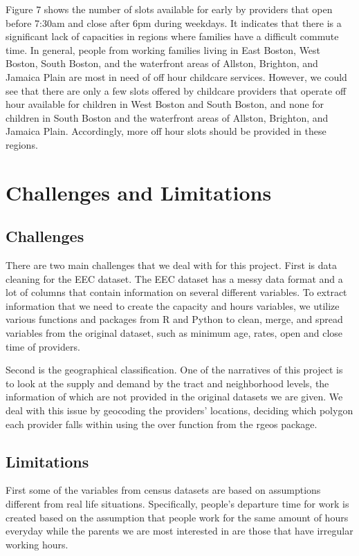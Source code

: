 \documentclass[10pt,letterpaper]{article}
\begin{document}
Figure 7 shows the number of slots available for early by providers that
open before 7:30am and close after 6pm during weekdays. It indicates
that there is a significant lack of capacities in regions where families
have a difficult commute time. In general, people from working families
living in East Boston, West Boston, South Boston, and the waterfront
areas of Allston, Brighton, and Jamaica Plain are most in need of off
hour childcare services. However, we could see that there are only a few
slots offered by childcare providers that operate off hour available for
children in West Boston and South Boston, and none for children in South
Boston and the waterfront areas of Allston, Brighton, and Jamaica Plain.
Accordingly, more off hour slots should be provided in these regions.

\section{Challenges and Limitations}\label{challenges-and-limitations}

\subsection{Challenges}\label{challenges}

There are two main challenges that we deal with for this project. First
is data cleaning for the EEC dataset. The EEC dataset has a messy data
format and a lot of columns that contain information on several
different variables. To extract information that we need to create the
capacity and hours variables, we utilize various functions and packages
from R and Python to clean, merge, and spread variables from the
original dataset, such as minimum age, rates, open and close time of
providers.

Second is the geographical classification. One of the narratives of this
project is to look at the supply and demand by the tract and
neighborhood levels, the information of which are not provided in the
original datasets we are given. We deal with this issue by geocoding the
providers' locations, deciding which polygon each provider falls within
using the over function from the rgeos package.

\subsection{Limitations}\label{limitations}

First some of the variables from census datasets are based on
assumptions different from real life situations. Specifically, people's
departure time for work is created based on the assumption that people
work for the same amount of hours everyday while the parents we are most
interested in are those that have irregular working hours.
\end{document}
